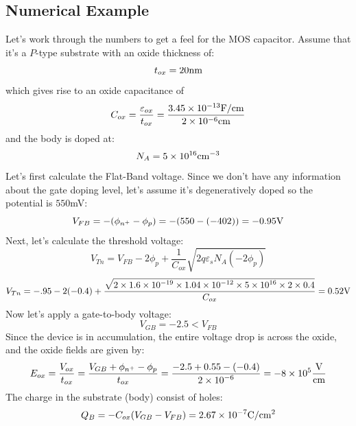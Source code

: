 \subsection{Numerical Example}
Let's work through the numbers to get a feel for the  MOS capacitor.   Assume that it's a  $P$-type substrate with an oxide thickness of:
    \begin{equation}
        {t_{ox}} = 20{\rm{nm}}
    \end{equation}
which gives rise to an oxide capacitance of 
    \begin{equation}
        {C_{ox}} = \frac{{{\varepsilon _{ox}}}}{{{t_{ox}}}} = \frac{{3.45 \times {{10}^{ - 13}}{\rm{F/cm}}}}{{{\rm{2}} \times {\rm{1}}{{\rm{0}}^{{\rm{ - 6}}}}{\rm{cm}}}}
    \end{equation}
and the body is doped at:
    \begin{equation}
        {N_A} = 5 \times {10^{16}}{\rm{c}}{{\rm{m}}^{ - 3}}
    \end{equation}
Let's first calculate the Flat-Band voltage.  Since we don't have any information about the gate doping level, let's assume it's degeneratively doped so the potential is $550$mV:
    \begin{equation}
        {V_{FB}} =  - ({\phi _{{n^ + }}} - {\phi _p}) =  - (550 - ( - 402)) =  - 0.95{\rm{V}}
    \end{equation}
Next, let's calculate the threshold voltage:
    \begin{equation}
        {V_{Tn}} = {V_{FB}} - 2{\phi _p} + \frac{1}{{{C_{ox}}}}\sqrt {2q{\varepsilon _s}{N_A}( - 2{\phi _p})} 
    \end{equation}
    \begin{equation}
        {V_{Tn}} =  - .95 - 2( - 0.4) + \frac{{\sqrt {2 \times 1.6 \times {{10}^{ - 19}} \times 1.04 \times {{10}^{ - 12}} \times 5 \times {{10}^{16}} \times 2 \times 0.4} }}{{{C_{ox}}}} = 0.52{\rm{V}}
    \end{equation}
Now let's apply a gate-to-body voltage:
    \begin{equation}
        {V_{GB}} =  - 2.5 < {V_{FB}}
    \end{equation}
Since the device is in accumulation, the entire voltage drop is across the oxide, and the oxide fields are given by:
    \begin{equation}
        {E_{ox}} = \frac{{{V_{ox}}}}{{{t_{ox}}}} = \frac{{{V_{GB}} + {\phi _{{n^ + }}} - {\phi _p}}}{{{t_{ox}}}} = \frac{{ - 2.5 + 0.55 - ( - 0.4)}}{{2 \times {{10}^{ - 6}}}} =  - 8 \times {10^5}\frac{{\rm{V}}}{{{\rm{cm}}}}
    \end{equation}
The charge in the substrate (body) consist of holes:
    \begin{equation}
        {Q_B} =  - {C_{ox}}({V_{GB}} - {V_{FB}}) = 2.67 \times {10^{ - 7}}{\rm{C/c}}{{\rm{m}}^{\rm{2}}}
    \end{equation}
